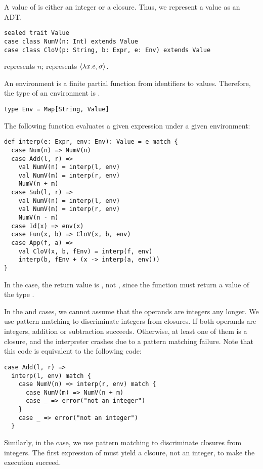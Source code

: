 A value of \Lang is either an integer or a closure. Thus, we represent a value
as an ADT.

\begin{verbatim}
sealed trait Value
case class NumV(n: Int) extends Value
case class CloV(p: String, b: Expr, e: Env) extends Value
\end{verbatim}

 represents $n$;  represents
$\langle\lambda x.e,\sigma\rangle$.

An environment is a finite partial function from identifiers to values.
Therefore, the type of an environment is .

\begin{verbatim}
type Env = Map[String, Value]
\end{verbatim}

The following function evaluates a given expression under a given environment:

\begin{verbatim}
def interp(e: Expr, env: Env): Value = e match {
  case Num(n) => NumV(n)
  case Add(l, r) =>
    val NumV(n) = interp(l, env)
    val NumV(m) = interp(r, env)
    NumV(n + m)
  case Sub(l, r) =>
    val NumV(n) = interp(l, env)
    val NumV(m) = interp(r, env)
    NumV(n - m)
  case Id(x) => env(x)
  case Fun(x, b) => CloV(x, b, env)
  case App(f, a) =>
    val CloV(x, b, fEnv) = interp(f, env)
    interp(b, fEnv + (x -> interp(a, env)))
}
\end{verbatim}

In the  case, the return value is , not ,
since the function must return a value of the type .

In the
 and  cases, we cannot assume that the operands are integers
any longer. We use pattern matching to discriminate integers from closures. If
both operands are integers, addition or subtraction succeeds. Otherwise, at
least one of them is a closure, and the interpreter crashes due to a pattern
matching failure. Note that this code is equivalent to the following code:

\begin{verbatim}
case Add(l, r) =>
  interp(l, env) match {
    case NumV(n) => interp(r, env) match {
      case NumV(m) => NumV(n + m)
      case _ => error("not an integer")
    }
    case _ => error("not an integer")
  }
\end{verbatim}

Similarly, in the  case, we use pattern matching to discriminate
closures from integers. The first expression of  must yield a clsoure,
not an integer, to make the execution succeed.

